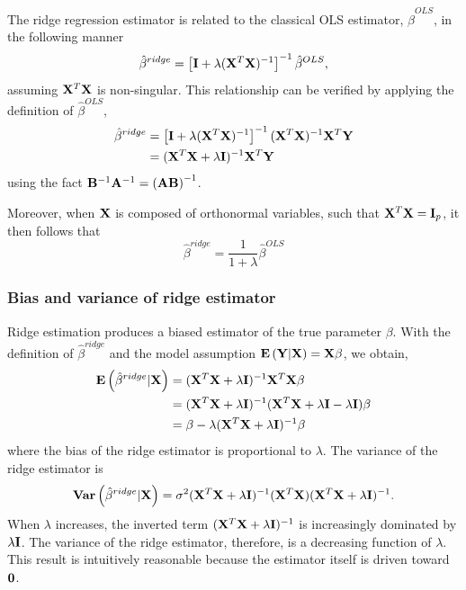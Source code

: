 The ridge regression estimator is related to the classical OLS estimator, $\hat{\beta}^{OLS}$, in the following manner
$$
\hat{\beta}^{ridge}  = \left[\mathbf{I} + \lambda (\mathbf{X}^T\mathbf{X})^{-1}\right] ^{-1} \hat{\beta}^{OLS},
$$
assuming $\mathbf{X}^T\mathbf{X}$ is non-singular.  This relationship can be verified by applying the definition of $\hat{\beta}^{OLS}$,
$$
\begin{aligned}
\hat{\beta}^{ridge}  &= \left[\mathbf{I} + \lambda (\mathbf{X}^T\mathbf{X})^{-1}\right] ^{-1} (\mathbf{X}^T\mathbf{X})^{-1} \mathbf{X}^T\mathbf{Y}\\
&=(\mathbf{X}^T\mathbf{X} + \lambda \mathbf{I})^{-1} \mathbf{X}^T \mathbf{Y}\\
\end{aligned}
$$
using the fact $\mathbf{B}^{-1}\mathbf{A}^{-1} = \mathbf{(AB)}^{-1}$.

Moreover, when $\mathbf{X}$ is composed of orthonormal variables, such that $\mathbf{X}^T\mathbf{X} = \mathbf{I}_p$, it then follows that 
$$
\hat{\beta}^{ridge} = \frac{1}{1 + \lambda} \hat{\beta}^{OLS}
$$

\subsubsection*{Bias and variance of ridge estimator}
Ridge estimation produces a biased estimator of the true parameter $\beta$.
With the definition of $\hat{\beta}^{ridge}$ and the model assumption ${\mathbf{E}\left(\mathbf{Y}|\mathbf{X}\right)} = \mathbf{X}\mathbf{\beta}$, we obtain,
$$
\begin{aligned}
{\mathbf{E}\left(\hat{\beta}^{ridge} | \mathbf{X}\right)} &= (\mathbf{X}^T\mathbf{X} + \lambda \mathbf{I})^{-1} \mathbf{X}^T \mathbf{X\beta}\\
&= (\mathbf{X}^T\mathbf{X} + \lambda \mathbf{I})^{-1}  (\mathbf{X}^T \mathbf{X} + \lambda \mathbf{I} - \lambda \mathbf{I}) \mathbf{\beta}\\
&= \beta - \lambda(\mathbf{X}^T\mathbf{X} + \lambda \mathbf{I})^{-1} \mathbf{\beta}\\
\end{aligned}
$$
where the bias of the ridge estimator is proportional to $\lambda$. 
The variance of the ridge estimator is
$$
\mathbf{Var}\left(\hat{\beta}^{ridge} | \mathbf{X}\right) = \sigma^2 (\mathbf{X}^T\mathbf{X} + \lambda \mathbf{I})^{-1} (\mathbf{X}^T\mathbf{X})  (\mathbf{X}^T\mathbf{X} + \lambda \mathbf{I})^{-1}.
$$
When $\lambda$ increases, the inverted term $(\mathbf{X}^T\mathbf{X} + \lambda \mathbf{I})^{-1}$ is increasingly dominated by $\lambda \mathbf{I}$.
The variance of the ridge estimator, therefore, is a decreasing function of $\lambda$.
This result is intuitively reasonable because the estimator itself is driven toward $\mathbf{0}$.

